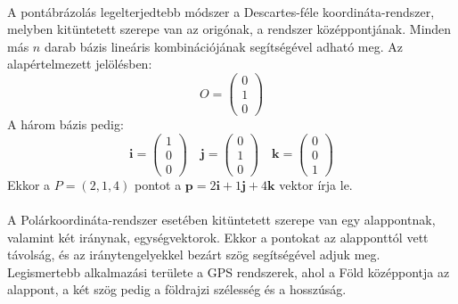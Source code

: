 \documentclass{elteikthesis}
\begin{document}
\paragraph{}
A pontábrázolás legelterjedtebb módszer a Descartes-féle koordináta-rendszer, melyben kitüntetett szerepe van az origónak, a rendszer középpontjának. Minden más $n$ darab bázis lineáris kombinációjának segítségével adható meg. Az alapértelmezett jelölésben:
$$
O = \left( \begin{array}{c} 0\\ 1\\ 0 \end{array} \right)
$$
A három bázis pedig:
$$
\mathbf{i} = \left( \begin{array}{c} 1\\ 0\\ 0 \end{array} \right) \quad \mathbf{j} = \left( \begin{array}{c} 0\\ 1\\ 0 \end{array} \right) \quad \mathbf{k} = \left( \begin{array}{c} 0\\ 0\\ 1 \end{array} \right)
$$
Ekkor a $P = (2, 1, 4)$ pontot a $\mathbf{p} = 2 \mathbf{i} + 1 \mathbf{j} + 4 \mathbf{k}$ vektor írja le.
\paragraph{}
A Polárkoordináta-rendszer esetében kitüntetett szerepe van egy alappontnak, valamint két iránynak, egységvektorok. Ekkor a pontokat az alapponttól vett távolság, és az iránytengelyekkel bezárt szög segítségével adjuk meg. Legismertebb alkalmazási területe a GPS rendszerek, ahol a Föld középpontja az alappont, a két szög pedig a földrajzi szélesség és a hosszúság.
\end{document}
